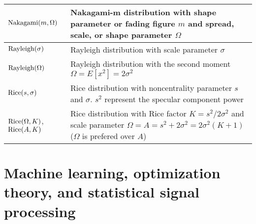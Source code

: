 \documentclass{article}
\begin{document}
\begin{xltabular}{\textwidth}{XX}
	\(\textnormal{Nakagami}(m, \Omega)\)                          & Nakagami-m distribution with shape parameter or fading figure \(m\) and spread, scale, or shape parameter \(\Omega\)                                               \\ \hline
	\(\textnormal{Rayleigh}(\sigma)\)                             & Rayleigh distribution with scale parameter \(\sigma\)                                                                                                              \\ \hline
	\(\textnormal{Rayleigh}(\Omega)\)                             & Rayleigh distribution with the second moment \(\Omega = E\left[ x^2 \right] = 2\sigma^2\)                                                                          \\ \hline
	\(\textnormal{Rice}(s, \sigma)\)                              & Rice distribution with noncentrality parameter \(s\) and \(\sigma\). \(s^2\) represent the specular component power                                                \\ \hline
	\(\textnormal{Rice}(\Omega, K)\), \(\textnormal{Rice}(A, K)\) & Rice distribution with Rice factor \(K=s^2/2\sigma^2\) and scale parameter \(\Omega = A = s^2 + 2\sigma^2 = 2\sigma^{2}(K+1)\) (\(\Omega\) is prefered over \(A\))
\end{xltabular}

\section{Machine learning, optimization theory, and \newline statistical signal processing}
\end{document}
